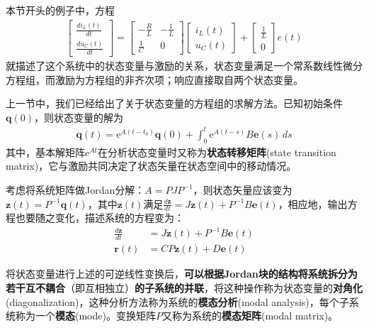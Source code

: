 \begin{example}
    本节开头的例子中，方程\begin{align*}
            \begin{bmatrix}
                \frac{di_L(t)}{dt}\\
                \frac{du_C(t)}{dt}
            \end{bmatrix}=
            \begin{bmatrix}
                -\frac{R}{L} & -\frac{1}{L}\\
                \frac{1}{C} & 0
            \end{bmatrix}
            \begin{bmatrix}
                i_L(t)\\
                u_C(t)
            \end{bmatrix}+
            \begin{bmatrix}
                \frac{1}{L}\\
                0
            \end{bmatrix}e(t)
        \end{align*}
    就描述了这个系统中的状态变量与激励的关系，状态变量满足一个常系数线性微分方程组，而激励为方程组的非齐次项；响应直接取自两个状态变量。
\end{example}

上一节中，我们已经给出了关于状态变量的方程组的求解方法。已知初始条件$\mathbf{q}(0)$，则状态变量的解为\begin{align*}
    \mathbf{q}(t)=\mathrm{e}^{A(t-t_0)}\mathbf{q}(0)+\int_{0}^t \mathrm{e}^{A(t-s)}B\mathbf{e}(s)\,ds
\end{align*}
其中，基本解矩阵$\mathrm{e}^{At}$在分析状态变量时又称为\textbf{状态转移矩阵}(state transition matrix)，它与激励共同决定了状态矢量在状态空间中的移动情况。

考虑将系统矩阵做Jordan分解：$A=PJP^{-1}$，则状态矢量应该变为$\mathbf{z}(t)=P^{-1}\mathbf{q}(t)$，其中$\mathbf{z}(t)$满足$\frac{d\mathbf{z}}{dt}=J\mathbf{z}(t)+P^{-1}B\mathbf{e}(t)$，相应地，输出方程也要随之变化，描述系统的方程变为：\begin{align*}
    \frac{d\mathbf{z}}{dt}&=J\mathbf{z}(t)+P^{-1}B\mathbf{e}(t)\\
    \mathbf{r}(t)&=CP\mathbf{z}(t)+D\mathbf{e}(t)
\end{align*}

将状态变量进行上述的可逆线性变换后，\textbf{可以根据Jordan块的结构将系统拆分为若干互不耦合}（即互相独立）\textbf{的子系统的并联}，将这种操作称为状态变量的\textbf{对角化}(diagonalization)，这种分析方法称为系统的\textbf{模态分析}(modal analysis)，每个子系统称为一个\textbf{模态}(mode)。变换矩阵$P$又称为系统的\textbf{模态矩阵}(modal matrix)。

